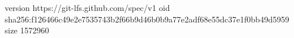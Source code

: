 version https://git-lfs.github.com/spec/v1
oid sha256:f126466c49e2e7535743b2f66b9d46b0b9a77e2adf68e55dc37e1f0bb49d5959
size 1572960
